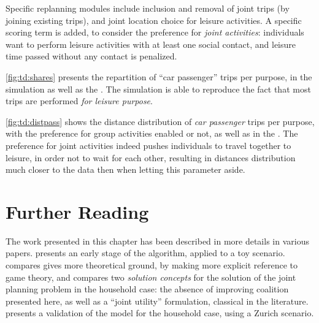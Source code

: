 {Specific replanning modules include inclusion and removal of joint trips (by joining existing trips),
and joint location choice for leisure activities.
A specific scoring term is added, to consider the preference for \emph{joint activities}:
individuals want to perform leisure activities with at least one social contact,
and leisure time passed without any contact is penalized.

\cref{fig:td:shares} presents the repartition of ``car passenger'' trips per purpose,
in the simulation as well as the \mz.
The simulation is able to reproduce the fact that most trips are performed
\emph{for leisure purpose}.


\cref{fig:td:distpass} shows the distance distribution of \emph{car passenger} trips per purpose,
with the preference for group activities enabled or not, as well as in the \mz.
The preference for joint activities indeed pushes individuals to travel together to leisure,
in order not to wait for each other, resulting in distances distribution much closer to the
\mz data then when letting this parameter aside.


\section{Further Reading}
The work presented in this chapter has been described in more details in various papers.
presents an early stage of the algorithm, applied to a toy scenario.
compares gives more theoretical ground,
by making more explicit reference to game theory,
and compares two \emph{solution concepts} for
the solution of the joint planning problem in the household case:
the absence of improving coalition presented here,
as well as a ``joint utility'' formulation,
classical in the literature.
presents a validation of the model for the household case,
using a Zurich scenario.

} %
